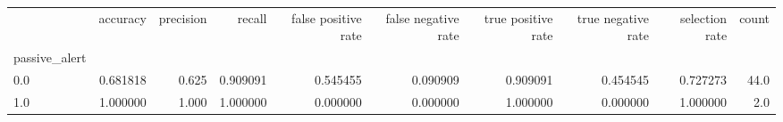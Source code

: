 \begin{tabular}{lrrrrrrrrr}
\toprule
{} &  accuracy &  precision &    recall &  false positive rate &  false negative rate &  true positive rate &  true negative rate &  selection rate &  count \\
passive\_alert &           &            &           &                      &                      &                     &                     &                 &        \\
\midrule
0.0           &  0.681818 &      0.625 &  0.909091 &             0.545455 &             0.090909 &            0.909091 &            0.454545 &        0.727273 &   44.0 \\
1.0           &  1.000000 &      1.000 &  1.000000 &             0.000000 &             0.000000 &            1.000000 &            0.000000 &        1.000000 &    2.0 \\
\bottomrule
\end{tabular}

